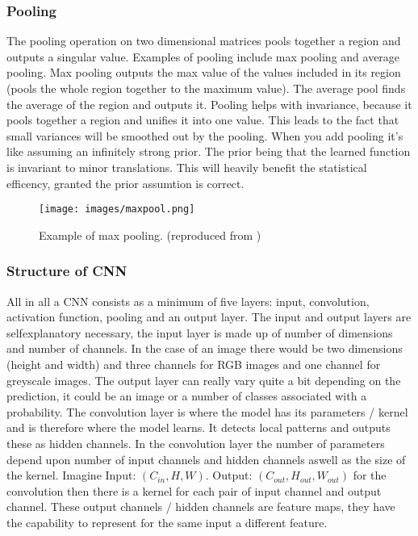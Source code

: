 \documentclass[a4paper,12pt]{article}
\begin{document}
\subsubsection{Pooling}
The pooling operation on two dimensional matrices pools together a region and outputs a singular value. Examples of pooling include max pooling and average pooling. Max pooling outputs the max value of the values included in its region (pools the whole region together to the maximum value). The average pool finds the average of the region and outputs it.
Pooling helps with invariance, because it pools together a region and unifies it into one value. This leads to the fact that small variances will be smoothed out by the pooling.
When you add pooling it's like assuming an infinitely strong prior. The prior being that the learned function is invariant to minor translations. This will heavily benefit the statistical efficency, granted the prior assumtion is correct.
\begin{figure}[H]
  \centering
  \texttt{[image: images/maxpool.png]}
  \caption{Example of max pooling. (reproduced from \cite{maxpool_cs_wiki})} %
  \label{fig:n7}
\end{figure}
\subsubsection{Structure of CNN}
All in all a CNN consists as a minimum of five layers: input, convolution, activation function, pooling and an output layer. 
The input and output layers are selfexplanatory necessary, the input layer is made up of number of dimensions and number of channels. In the case of an image there would be two dimensions (height and width) and three channels for RGB images and one channel for greyscale images. The output layer can really vary quite a bit depending on the prediction, it could be an image or a number of classes associated with a probability.
The convolution layer is where the model has its parameters / kernel and is therefore where the model learns. It detects local patterns and outputs these as hidden channels. In the convolution layer the number of parameters depend upon number of input channels and hidden channels aswell as the size of the kernel. Imagine Input: $(C_{in}, H, W)$. Output: $(C_{out}, H_{out}, W_{out})$ for the convolution then there is a kernel for each pair of input channel and output channel. These output channels / hidden channels are feature maps, they have the capability to represent for the same input a different feature.
\end{document}
